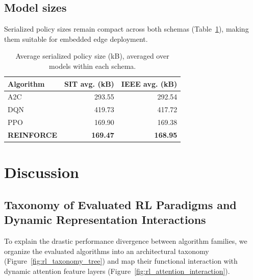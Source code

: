 \documentclass[sn-basic]{sn-jnl}%
\begin{document}
\subsection{Model sizes}
Serialized policy sizes remain compact across both schemas (Table~\ref{tab:model_size_summary}), making them suitable for embedded edge deployment.

\begin{table}[htbp]
\centering
\caption{Average serialized policy size (kB), averaged over models within each schema.}
\label{tab:model_size_summary}
\begin{tabular}{l r r}
\toprule
	\textbf{Algorithm} & \textbf{SIT avg. (kB)} & \textbf{IEEE avg. (kB)}\\
	\midrule
	A2C & 293.55 & 292.54\\
	DQN & 419.73 & 417.72\\
	PPO & 169.90 & 169.38\\
	\textbf{REINFORCE} & \textbf{169.47} & \textbf{168.95}\\
\bottomrule
\end{tabular}
\end{table}


\section{Discussion}
\label{sec:discussion}

\subsection{Taxonomy of Evaluated RL Paradigms and Dynamic Representation Interactions}

To explain the drastic performance divergence between algorithm families, we organize the evaluated algorithms into an architectural taxonomy (Figure~\ref{fig:rl_taxonomy_tree}) and map their functional interaction with dynamic attention feature layers (Figure~\ref{fig:rl_attention_interaction}).
\end{document}
